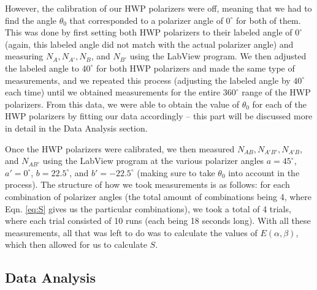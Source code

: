 \documentclass[twocolumn,amsmath,amssymb,pra]{revtex4-2}
\begin{document}
However, the calibration of our HWP polarizers were off, meaning that we had to find the angle $\theta_{0}$ that corresponded to a polarizer angle of $0^{\circ}$ for both of them. This was done by first setting both HWP polarizers to their labeled angle of $0^{\circ}$ (again, this labeled angle did not match with the actual polarizer angle) and measuring $N_{A}, N_{A'}, N_{B}$, and $N_{B'}$ using the LabView program. We then adjusted the labeled angle to $40^{\circ}$ for both HWP polarizers and made the same type of measurements, and we repeated this process (adjusting the labeled angle by $40^{\circ}$ each time) until we obtained measurements for the entire $360^{\circ}$ range of the HWP polarizers. From this data, we were able to obtain the value of $\theta_{0}$ for each of the HWP polarizers by fitting our data accordingly -- this part will be discussed more in detail in the Data Analysis section. 

Once the HWP polarizers were calibrated, we then measured $N_{AB}, N_{A'B'}, N_{A'B}$, and $N_{AB'}$ using the LabView program at the various polarizer angles $a = 45^{\circ}$, $a' = 0^{\circ}$, $b = 22.5^{\circ}$, and $b' = -22.5^{\circ}$ (making sure to take $\theta_{0}$ into account in the process). The structure of how we took measurements is as follows: for each combination of polarizer angles (the total amount of combinations being 4, where Eqn. \ref{eq:S} gives us the particular combinations), we took a total of 4 trials, where each trial consisted of 10 runs (each being 18 seconds long). With all these measurements, all that was left to do was to calculate the values of $E(\alpha, \beta)$, which then allowed for us to calculate $S$.

\subsection{Data Analysis}
\end{document}
